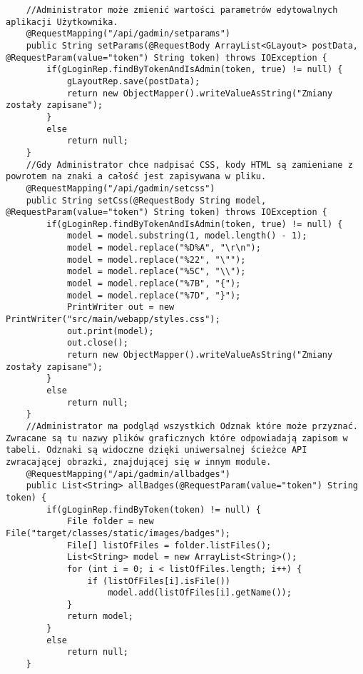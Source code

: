 \documentclass[a4paper,12pt,twoside,openany]{report}
\begin{document}
\begin{lstlisting}
    //Administrator może zmienić wartości parametrów edytowalnych aplikacji Użytkownika.
    @RequestMapping("/api/gadmin/setparams")
    public String setParams(@RequestBody ArrayList<GLayout> postData, @RequestParam(value="token") String token) throws IOException {
        if(gLoginRep.findByTokenAndIsAdmin(token, true) != null) {
            gLayoutRep.save(postData);
            return new ObjectMapper().writeValueAsString("Zmiany zostały zapisane");
        }
        else
            return null;
    }
    //Gdy Administrator chce nadpisać CSS, kody HTML są zamieniane z powrotem na znaki a całość jest zapisywana w pliku.
    @RequestMapping("/api/gadmin/setcss")
    public String setCss(@RequestBody String model, @RequestParam(value="token") String token) throws IOException {
        if(gLoginRep.findByTokenAndIsAdmin(token, true) != null) {
            model = model.substring(1, model.length() - 1);
            model = model.replace("%D%A", "\r\n");
            model = model.replace("%22", "\"");
            model = model.replace("%5C", "\\");
            model = model.replace("%7B", "{");
            model = model.replace("%7D", "}");
            PrintWriter out = new PrintWriter("src/main/webapp/styles.css");
            out.print(model);
            out.close();
            return new ObjectMapper().writeValueAsString("Zmiany zostały zapisane");
        }
        else
            return null;
    }
    //Administrator ma podgląd wszystkich Odznak które może przyznać. Zwracane są tu nazwy plików graficznych które odpowiadają zapisom w tabeli. Odznaki są widoczne dzięki uniwersalnej ścieżce API zwracającej obrazki, znajdującej się w innym module.
    @RequestMapping("/api/gadmin/allbadges")
    public List<String> allBadges(@RequestParam(value="token") String token) {
        if(gLoginRep.findByToken(token) != null) {
            File folder = new File("target/classes/static/images/badges");
            File[] listOfFiles = folder.listFiles();
            List<String> model = new ArrayList<String>();
            for (int i = 0; i < listOfFiles.length; i++) {
                if (listOfFiles[i].isFile())
                    model.add(listOfFiles[i].getName());
            }
            return model;
        }
        else
            return null;
    }
    

\end{lstlisting}
\end{document}
